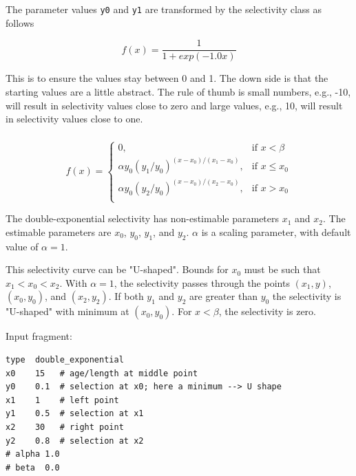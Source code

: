 The parameter values \texttt{y0} and \texttt{y1} are transformed by the selectivity class as follows

\[
f(x) = \frac{1}{1+exp(-1.0 x )}
\] 

This is to ensure the values stay between 0 and 1. The down side is that the starting values are a little abstract. The rule of thumb is small numbers, e.g., -10, will result in selectivity values close to zero and large values, e.g., 10, will result in selectivity values close to one.

\subsubsection[Double-exponential]{}\label{sec:Selectivity-DoubleExponential}

\begin{equation}
f(x)=\begin{cases}
	  0, & \text{if $x < \beta$} \\
	  \alpha y_0(y_1 / y_0)^{(x-x_0)/(x_1-x_0)}, & \text{if $x \le x_0$} \\
	  \alpha y_0(y_2 / y_0)^{(x-x_0)/(x_2-x_0)}, & \text{if $x > x_0$} \\
  \end{cases}
\end{equation}

The double-exponential selectivity has non-estimable parameters $x_1$ and $x_2$. The estimable parameters are $x_0$, $y_0$, $y_1$, and $y_2$.  $\alpha$ is a scaling parameter, with default value of $\alpha = 1$. 

This selectivity curve can be "U-shaped". Bounds for $x_0$ must be such that $x_1 < x_0 < x_2$. With $\alpha=1$, the selectivity passes through the points $(x_1, y)$, $(x_0, y_0)$, and $(x_2, y_2)$. If both $y_1$ and $y_2$ are greater than $y_0$ the selectivity is "U-shaped" with minimum at $(x_0, y_0)$.  For $x < \beta$, the selectivity is zero.

Input fragment: {\small{\begin{verbatim}
type  double_exponential
x0    15   # age/length at middle point
y0    0.1  # selection at x0; here a minimum --> U shape
x1    1    # left point
y1    0.5  # selection at x1
x2    30   # right point
y2    0.8  # selection at x2
# alpha 1.0
# beta  0.0
\end{verbatim}}}

%
%

